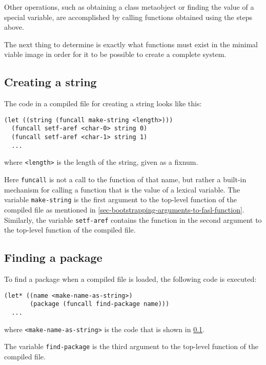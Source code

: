 Other operations, such as obtaining a class metaobject or finding the
value of a special variable, are accomplished by calling functions
obtained using the steps above.

The next thing to determine is exactly what functions must exist in
the minimal viable image in order for it to be possible to create a
complete \commonlisp{} system.

\subsection{Creating a string}
\label{sec-bootstrapping-creating-a-string}

The code in a compiled file for creating a string looks like this:

\begin{verbatim}
(let ((string (funcall make-string <length>)))
  (funcall setf-aref <char-0> string 0)
  (funcall setf-aref <char-1> string 1)
  ...
\end{verbatim}

where \texttt{<length>} is the length of the string, given as a
fixnum.

Here \texttt{funcall} is not a call to the \commonlisp{} function of
that name, but rather a built-in mechanism for calling a function that
is the value of a lexical variable.  The variable \texttt{make-string}
is the first argument to the top-level function of the compiled file
as mentioned in \ref{sec-bootstrapping-arguments-to-fasl-function}.
Similarly, the variable \texttt{setf-aref} contains the function in
the second argument to the top-level function of the compiled file.

\subsection{Finding a package}
\label{sec-bootstrapping-finding-a-package}

To find a package when a compiled file is loaded, the following code
is executed:

\begin{verbatim}
(let* ((name <make-name-as-string>)
       (package (funcall find-package name)))
  ...
\end{verbatim}

where \texttt{<make-name-as-string>} is the code that is shown in
\ref{sec-bootstrapping-creating-a-string}.

The variable \texttt{find-package} is the third argument to the
top-level function of the compiled file.

